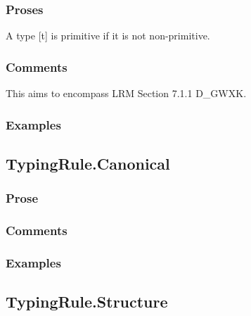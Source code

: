 \documentclass{book}
\begin{document}
    \subsubsection{Proses} 
    A type [t] is primitive if it is not non-primitive.

    \subsubsection{Comments}
    This aims to encompass LRM Section 7.1.1 D\_GWXK.

    \subsubsection{Examples}

\subsection{TypingRule.Canonical}

     \subsubsection{Prose}

     \subsubsection{Comments}

     \subsubsection{Examples}

\subsection{TypingRule.Structure}
\end{document}
